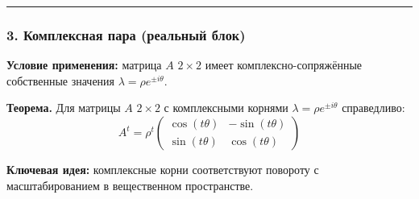 \bigskip
\hrule
\bigskip

\subsubsection*{3. Комплексная пара (реальный блок)}

\textbf{Условие применения:} матрица $A$ $2 \times 2$ имеет комплексно-сопряжённые собственные значения $\lambda = \rho e^{\pm i\theta}$.

\textbf{Теорема.} Для матрицы $A$ $2 \times 2$ с комплексными корнями $\lambda = \rho e^{\pm i\theta}$ справедливо:
\[
A^t = \rho^t \begin{pmatrix} \cos(t\theta) & -\sin(t\theta) \\ \sin(t\theta) & \cos(t\theta) \end{pmatrix}
\]

\textbf{Ключевая идея:} комплексные корни соответствуют повороту с масштабированием в вещественном пространстве.


